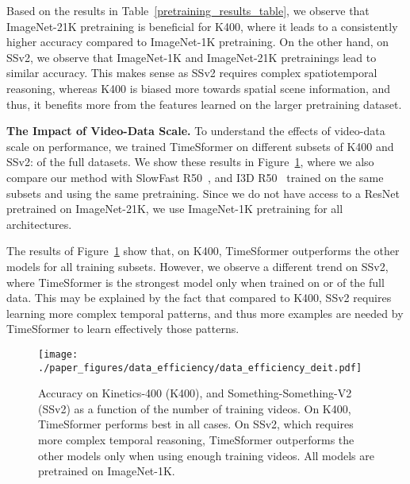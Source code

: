 \documentclass{article}
\begin{document}
Based on the results in Table~\ref{pretraining_results_table}, we observe that ImageNet-21K pretraining is beneficial for K400, where it leads to a consistently higher accuracy compared to ImageNet-1K pretraining.  On the other hand, on SSv2, we observe that ImageNet-1K and ImageNet-21K pretrainings lead to similar accuracy. This makes sense as SSv2 requires complex spatiotemporal reasoning, whereas K400 is biased more towards spatial scene information, and thus, it benefits more from the features learned on the larger pretraining dataset.





\textbf{The Impact of Video-Data Scale.} To understand the effects of video-data scale on performance, we trained TimeSformer on different subsets of K400 and SSv2:  of the full datasets. We show these results in Figure~\ref{data_efficiency_fig}, where we also compare our method with SlowFast R50~\cite{slowfast}, and I3D R50~\cite{DBLP:conf/cvpr/CarreiraZ17} trained on the same subsets and using the same pretraining. Since we do not have access to a ResNet pretrained on ImageNet-21K, we use ImageNet-1K pretraining for all  architectures.




The results of Figure~\ref{data_efficiency_fig} show that, on K400, TimeSformer outperforms the other models for all training subsets. However, we observe a different trend on SSv2, where TimeSformer is the strongest model only when trained on  or  of the full data. This may be explained by the fact that compared to K400, SSv2 requires learning more complex temporal patterns, and thus more examples are needed by TimeSformer to learn effectively those patterns.








\begin{figure}
\begin{center}
   \texttt{[image: ./paper\_figures/data\_efficiency/data\_efficiency\_deit.pdf]}
\end{center}
\vspace{-0.5cm}
        \caption{Accuracy on Kinetics-400 (K400), and Something-Something-V2 (SSv2) as a function of the number of training videos. On K400, TimeSformer performs best in all cases. On SSv2, which requires more complex temporal reasoning, TimeSformer outperforms the other models only when using enough training videos. All models are pretrained on ImageNet-1K.\vspace{-0.2cm}}
\label{data_efficiency_fig}
\end{figure}
\end{document}
